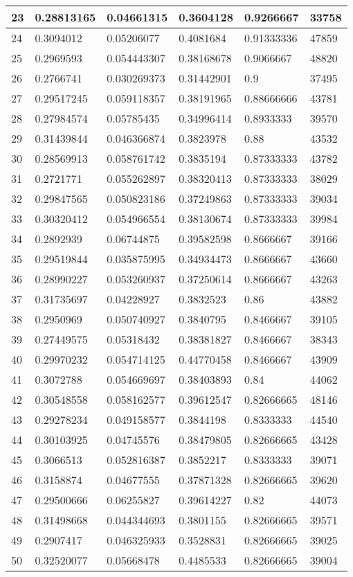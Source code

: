 \begin{longtable}{|l|l|l|l|l|l|}
23 & 0.28813165 & 0.04661315 & 0.3604128 & 0.9266667 & 33758 \\ \hline 
24 & 0.3094012 & 0.05206077 & 0.4081684 & 0.91333336 & 47859 \\ \hline 
25 & 0.2969593 & 0.054443307 & 0.38168678 & 0.9066667 & 48820 \\ \hline 
26 & 0.2766741 & 0.030269373 & 0.31442901 & 0.9 & 37495 \\ \hline 
27 & 0.29517245 & 0.059118357 & 0.38191965 & 0.88666666 & 43781 \\ \hline 
28 & 0.27984574 & 0.05785435 & 0.34996414 & 0.8933333 & 39570 \\ \hline 
29 & 0.31439844 & 0.046366874 & 0.3823978 & 0.88 & 43532 \\ \hline 
30 & 0.28569913 & 0.058761742 & 0.3835194 & 0.87333333 & 43782 \\ \hline 
31 & 0.2721771 & 0.055262897 & 0.38320413 & 0.87333333 & 38029 \\ \hline 
32 & 0.29847565 & 0.050823186 & 0.37249863 & 0.87333333 & 39034 \\ \hline 
33 & 0.30320412 & 0.054966554 & 0.38130674 & 0.87333333 & 39984 \\ \hline 
34 & 0.2892939 & 0.06744875 & 0.39582598 & 0.8666667 & 39166 \\ \hline 
35 & 0.29519844 & 0.035875995 & 0.34934473 & 0.8666667 & 43660 \\ \hline 
36 & 0.28990227 & 0.053260937 & 0.37250614 & 0.8666667 & 43263 \\ \hline 
37 & 0.31735697 & 0.04228927 & 0.3832523 & 0.86 & 43882 \\ \hline 
38 & 0.2950969 & 0.050740927 & 0.3840795 & 0.8466667 & 39105 \\ \hline 
39 & 0.27449575 & 0.05318432 & 0.38381827 & 0.8466667 & 38343 \\ \hline 
40 & 0.29970232 & 0.054714125 & 0.44770458 & 0.8466667 & 43909 \\ \hline 
41 & 0.3072788 & 0.054669697 & 0.38403893 & 0.84 & 44062 \\ \hline 
42 & 0.30548558 & 0.058162577 & 0.39612547 & 0.82666665 & 48146 \\ \hline 
43 & 0.29278234 & 0.049158577 & 0.3844198 & 0.8333333 & 44540 \\ \hline 
44 & 0.30103925 & 0.04745576 & 0.38479805 & 0.82666665 & 43428 \\ \hline 
45 & 0.3066513 & 0.052816387 & 0.3852217 & 0.8333333 & 39071 \\ \hline 
46 & 0.3158874 & 0.04677555 & 0.37871328 & 0.82666665 & 39620 \\ \hline 
47 & 0.29500666 & 0.06255827 & 0.39614227 & 0.82 & 44073 \\ \hline 
48 & 0.31498668 & 0.044344693 & 0.3801155 & 0.82666665 & 39571 \\ \hline 
49 & 0.2907417 & 0.046325933 & 0.3528831 & 0.82666665 & 39025 \\ \hline 
50 & 0.32520077 & 0.05668478 & 0.4485533 & 0.82666665 & 39004 \\ \hline 
\end{longtable}